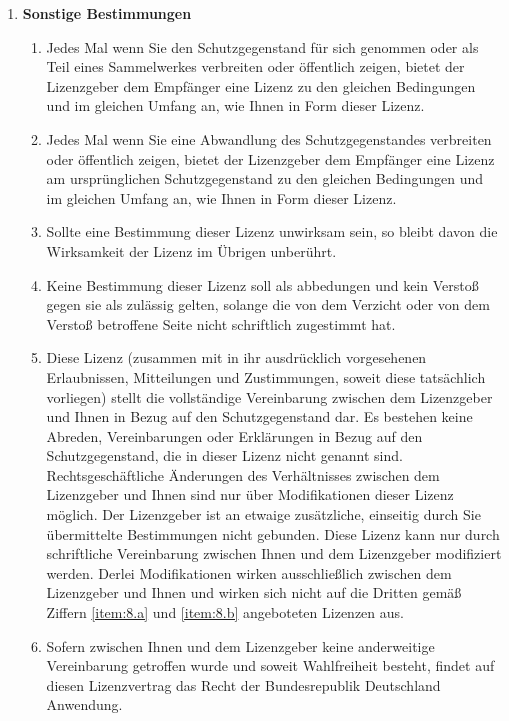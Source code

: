 \begin{enumerate}
  \item \label{item:8} \textbf{Sonstige Bestimmungen}
    \begin{enumerate}
      \item \label{item:8.a} Jedes Mal wenn Sie den Schutzgegenstand für sich genommen oder als Teil eines Sammelwerkes verbreiten oder öffentlich zeigen, bietet der Lizenzgeber dem Empfänger eine Lizenz zu den gleichen Bedingungen und im gleichen Umfang an, wie Ihnen in Form dieser Lizenz.
      \item \label{item:8.b} Jedes Mal wenn Sie eine Abwandlung des Schutzgegenstandes verbreiten oder öffentlich zeigen, bietet der Lizenzgeber dem Empfänger eine Lizenz am ursprünglichen Schutzgegenstand zu den gleichen Bedingungen und im gleichen Umfang an, wie Ihnen in Form dieser Lizenz.
      \item Sollte eine Bestimmung dieser Lizenz unwirksam sein, so bleibt davon die Wirksamkeit der Lizenz im Übrigen unberührt.
      \item Keine Bestimmung dieser Lizenz soll als abbedungen und kein Verstoß gegen sie als zulässig gelten, solange die von dem Verzicht oder von dem Verstoß betroffene Seite nicht schriftlich zugestimmt hat.
      \item Diese Lizenz (zusammen mit in ihr ausdrücklich vorgesehenen Erlaubnissen, Mitteilungen und Zustimmungen, soweit diese tatsächlich vorliegen) stellt die vollständige Vereinbarung zwischen dem Lizenzgeber und Ihnen in Bezug auf den Schutzgegenstand dar. Es bestehen keine Abreden, Vereinbarungen oder Erklärungen in Bezug auf den Schutzgegenstand, die in dieser Lizenz nicht genannt sind. Rechtsgeschäftliche Änderungen des Verhältnisses zwischen dem Lizenzgeber und Ihnen sind nur über Modifikationen dieser Lizenz möglich. Der Lizenzgeber ist an etwaige zusätzliche, einseitig durch Sie übermittelte Bestimmungen nicht gebunden. Diese Lizenz kann nur durch schriftliche Vereinbarung zwischen Ihnen und dem Lizenzgeber modifiziert werden. Derlei Modifikationen wirken ausschließlich zwischen dem Lizenzgeber und Ihnen und wirken sich nicht auf die Dritten gemäß Ziffern \ref{item:8.a} und \ref{item:8.b} angeboteten Lizenzen aus.
      \item Sofern zwischen Ihnen und dem Lizenzgeber keine anderweitige Vereinbarung getroffen wurde und soweit Wahlfreiheit besteht, findet auf diesen Lizenzvertrag das Recht der Bundesrepublik Deutschland Anwendung.
    \end{enumerate}
\end{enumerate}

